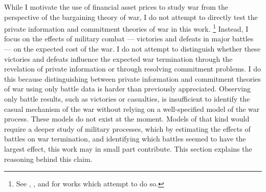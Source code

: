 While I motivate the use of financial asset prices to study war from the perspective of the bargaining theory of war, I do not attempt to directly test the private information and commitment theories of war in this work.%
\footnote{See \textcite{Ramsay2008}, \textcite{Weisiger2015}, and \textcite{Reiter2009} for works which attempt to do so.}
Instead, I focus on the effects of military combat --- victories and defeats in major battles --- on the expected cost of the war.
I do not attempt to distinguish whether these victories and defeats influence the expected war termination through the revelation of private information or through resolving commitment problems.
I do this because distinguishing between private information and commitment theories of war using only battle data is harder than previously appreciated.
Observing only battle results, such as victories or casualties, is insufficient to identify the casual mechanism of the war without relying on a well-specified model of the war process.%
These models do not exist at the moment.
Models of that kind would require a deeper study of military processes, which by estimating the effects of battles on war termination, and identifying which battles seemed to have the largest effect, this work may in small part contribute.
This section explains the reasoning behind this claim.

